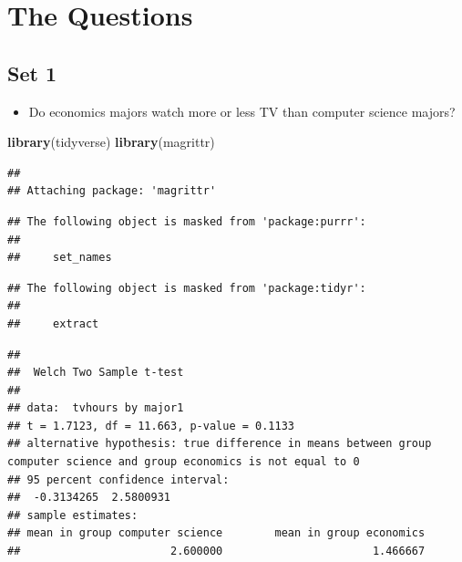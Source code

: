 \documentclass[
]{book}
\newenvironment{Shaded}{\begin{snugshade}}{\end{snugshade}}
\newcommand{\FunctionTok}[1]{\textcolor[rgb]{0.13,0.29,0.53}{\textbf{#1}}}
\newcommand{\NormalTok}[1]{#1}
\newcommand{\SpecialCharTok}[1]{\textcolor[rgb]{0.81,0.36,0.00}{\textbf{#1}}}
\newcommand{\StringTok}[1]{\textcolor[rgb]{0.31,0.60,0.02}{#1}}
\providecommand{\tightlist}{%
  \setlength{\itemsep}{0pt}\setlength{\parskip}{0pt}}
\theoremstyle{definition}
\theoremstyle{definition}
\theoremstyle{definition}
\theoremstyle{definition}
\theoremstyle{remark}
\begin{document}
\hypertarget{the-questions}{%
\section{The Questions}\label{the-questions}}

\hypertarget{set-1}{%
\subsection{Set 1}\label{set-1}}

\begin{itemize}
\tightlist
\item
  Do economics majors watch more or less TV than computer science majors?
\end{itemize}

\begin{Shaded}
\begin{Highlighting}[]
\FunctionTok{library}\NormalTok{(tidyverse)}
\FunctionTok{library}\NormalTok{(magrittr)}
\end{Highlighting}
\end{Shaded}

\begin{verbatim}
## 
## Attaching package: 'magrittr'
\end{verbatim}

\begin{verbatim}
## The following object is masked from 'package:purrr':
## 
##     set_names
\end{verbatim}

\begin{verbatim}
## The following object is masked from 'package:tidyr':
## 
##     extract
\end{verbatim}

\begin{Shaded}
\end{Shaded}

\begin{verbatim}
## 
##  Welch Two Sample t-test
## 
## data:  tvhours by major1
## t = 1.7123, df = 11.663, p-value = 0.1133
## alternative hypothesis: true difference in means between group computer science and group economics is not equal to 0
## 95 percent confidence interval:
##  -0.3134265  2.5800931
## sample estimates:
## mean in group computer science        mean in group economics 
##                       2.600000                       1.466667
\end{verbatim}
\end{document}
